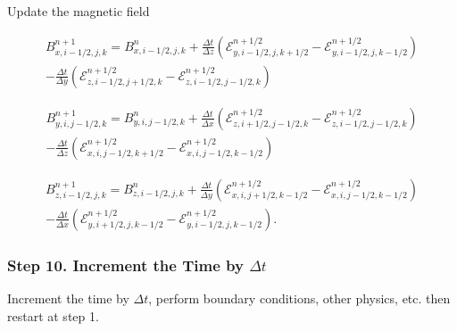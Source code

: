 Update the magnetic field

\begin{equation}
    \begin{aligned}
        B^{n+1}_{x,i-1/2,j,k} = B^{n}_{x,i-1/2,j,k}
        + \frac{\Delta t}{\Delta z} \left( \mathcal{E}^{n+1/2}_{y,i-1/2,j,k+1/2} - \mathcal{E}^{n+1/2}_{y,i-1/2,j,k-1/2} \right) \\
        - \frac{\Delta t}{\Delta y} \left( \mathcal{E}^{n+1/2}_{z,i-1/2,j+1/2,k} - \mathcal{E}^{n+1/2}_{z,i-1/2,j-1/2,k} \right)
    \end{aligned}
\end{equation}

\begin{equation}
    \begin{aligned}
        B^{n+1}_{y,i,j-1/2,k} = B^{n}_{y,i,j-1/2,k}
        + \frac{\Delta t}{\Delta x} \left( \mathcal{E}^{n+1/2}_{z,i+1/2,j-1/2,k} - \mathcal{E}^{n+1/2}_{z,i-1/2,j-1/2,k} \right) \\
        - \frac{\Delta t}{\Delta z} \left( \mathcal{E}^{n+1/2}_{x,i,j-1/2,k+1/2} - \mathcal{E}^{n+1/2}_{x,i,j-1/2,k-1/2} \right)
    \end{aligned}
\end{equation}

\begin{equation}
    \begin{aligned}
        B^{n+1}_{z,i-1/2,j,k} = B^{n}_{z,i-1/2,j,k}
        + \frac{\Delta t}{\Delta y} \left( \mathcal{E}^{n+1/2}_{x,i,j+1/2,k-1/2} - \mathcal{E}^{n+1/2}_{x,i,j-1/2,k-1/2} \right) \\
        - \frac{\Delta t}{\Delta x} \left( \mathcal{E}^{n+1/2}_{y,i+1/2,j,k-1/2} - \mathcal{E}^{n+1/2}_{y,i-1/2,j,k-1/2} \right).
    \end{aligned}
\end{equation}

\subsubsection{Step 10. Increment the Time by \texorpdfstring{$\Delta t$}{dt}}
\label{vlct:increment-time}

Increment the time by $\Delta t$, perform boundary conditions, other physics, etc. then restart at step 1.
